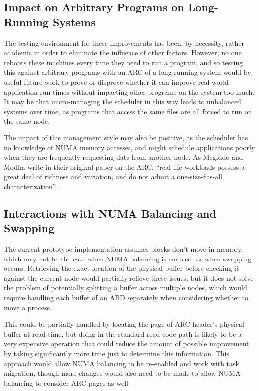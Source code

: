\subsection{Impact on Arbitrary Programs on Long-Running Systems}
The testing environment for these improvements has been, by necessity, rather academic in order to eliminate the influence of other factors.
However, no one reboots these machines every time they need to run a program, and so testing this against arbitrary programs with 
an ARC of a long-running system would be useful future work to prove or disprove whether it can improve real-world application
run times without impacting other programs on the system too much.
It may be that micro-managing the scheduler in this way leads to unbalanced systems over time,
as programs that access the same files are all forced to run on the same node.

The impact of this management style may also be positive, as the scheduler has no knowledge of NUMA memory accesses, 
and might schedule applications poorly when they are frequently requesting data from another node.
As Megiddo and Modha write in their original paper on the ARC, ``real-life workloads possess a great deal of
richness and variation, and do not admit a one-size-fits-all characterization'' \cite{megiddo_dharmendra_ARC}.

\subsection{Interactions with NUMA Balancing and Swapping}
The current prototype implementation assumes blocks don't move in memory, 
which may not be the case when NUMA balancing is enabled, or when swapping occurs.
Retrieving the exact location of the physical buffer before checking it against the current node would partially relieve these issues, 
but it does not solve the problem of potentially splitting a buffer across multiple nodes, which would require handling
each buffer of an ABD separately when considering whether to move a process.

This could be partially handled by locating the page of ARC header's physical buffer at read time, but doing in the standard read code path is likely to be a very expensive operation 
that could reduce the amount of possible improvement by taking significantly more time just to determine this information.
This approach would allow NUMA balancing to be re-enabled and work with task migration, though more changes would also need to be made
to allow NUMA balancing to consider ARC pages as well.

